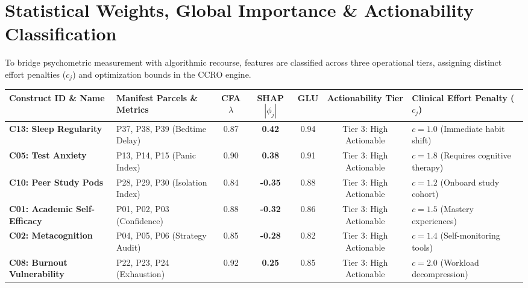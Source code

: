 \documentclass[10pt,a4paper]{article}
\begin{document}
\newpage
\section{Statistical Weights, Global Importance \& Actionability Classification}

To bridge psychometric measurement with algorithmic recourse, features are classified across three operational tiers, assigning distinct effort penalties ($c_j$) and optimization bounds in the CCRO engine.

\begin{table}[h!]
\centering
\footnotesize
\setlength{\tabcolsep}{3.5pt}
\renewcommand{\arraystretch}{1.2}
\begin{tabularx}{\textwidth}{p{3.2cm}p{3.1cm}cccc>{\raggedright\arraybackslash}X}
\toprule
\textbf{Construct ID \& Name} & \textbf{Manifest Parcels \& Metrics} & \textbf{CFA $\lambda$} & \textbf{SHAP $|\phi_j|$} & \textbf{GLU} & \textbf{Actionability Tier} & \textbf{Clinical Effort Penalty ($c_j$)} \\
\midrule
\rowcolor{RedLight} \textbf{C13: Sleep Regularity} & P37, P38, P39 (Bedtime Delay) & 0.87 & \textbf{0.42} & 0.94 & Tier 3: High Actionable & $c = 1.0$ (Immediate habit shift) \\
\rowcolor{RedLight} \textbf{C05: Test Anxiety} & P13, P14, P15 (Panic Index) & 0.90 & \textbf{0.38} & 0.91 & Tier 3: High Actionable & $c = 1.8$ (Requires cognitive therapy) \\
\rowcolor{BlueLight} \textbf{C10: Peer Study Pods} & P28, P29, P30 (Isolation Index) & 0.84 & \textbf{-0.35} & 0.88 & Tier 3: High Actionable & $c = 1.2$ (Onboard study cohort) \\
\rowcolor{BlueLight} \textbf{C01: Academic Self-Efficacy} & P01, P02, P03 (Confidence) & 0.88 & \textbf{-0.32} & 0.86 & Tier 3: High Actionable & $c = 1.5$ (Mastery experiences) \\
\rowcolor{BlueLight} \textbf{C02: Metacognition} & P04, P05, P06 (Strategy Audit) & 0.85 & \textbf{-0.28} & 0.82 & Tier 3: High Actionable & $c = 1.4$ (Self-monitoring tools) \\
\rowcolor{RedLight} \textbf{C08: Burnout Vulnerability} & P22, P23, P24 (Exhaustion) & 0.92 & \textbf{0.25} & 0.85 & Tier 3: High Actionable & $c = 2.0$ (Workload decompression) \\

\end{tabularx}
\end{table}
\end{document}
